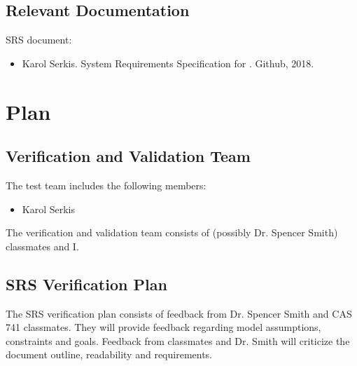 \documentclass[12pt, titlepage]{article}
\begin{document}

\subsection{Relevant Documentation}
SRS document:
\begin{itemize}
	\item Karol Serkis. System Requirements Specification for \progname. 
	Github, 2018.
\end{itemize}


\section{Plan}
	
\subsection{Verification and Validation Team}
The test team includes the following members:
\begin{itemize}
\item Karol Serkis
\end{itemize}
The verification and validation team consists of (possibly Dr. Spencer Smith) classmates and I. \\


\subsection{SRS Verification Plan}

The SRS verification plan consists of feedback from Dr. Spencer Smith and CAS 741 classmates. 
They will provide feedback regarding model assumptions, constraints and goals. 
Feedback from classmates and Dr. Smith will criticize the document outline, 
readability and requirements. \\   
\end{document}
